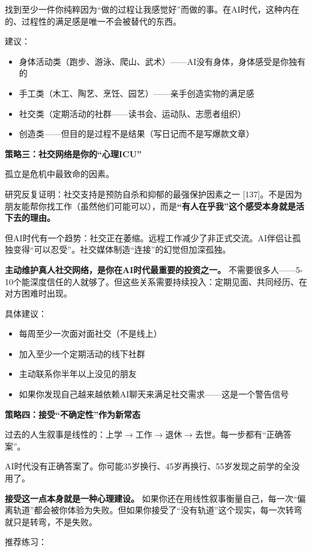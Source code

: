\documentclass[11pt,a4paper]{ctexart}
\begin{document}
找到至少一件你纯粹因为“做的过程让我感觉好”而做的事。在AI时代，这种内在的、过程性的满足感是唯一不会被替代的东西。

建议：

\begin{itemize}
  \item 身体活动类（跑步、游泳、爬山、武术）——AI没有身体，身体感受是你独有的
  \item 手工类（木工、陶艺、烹饪、园艺）——亲手创造实物的满足感
  \item 社交类（定期活动的社群——读书会、运动队、志愿者组织）
  \item 创造类——但目的是过程不是结果（写日记而不是写爆款文章）
\end{itemize}

\textbf{策略三：社交网络是你的“心理ICU”}

孤立是危机中最致命的因素。

研究反复证明：社交支持是预防自杀和抑郁的最强保护因素之一 [137]。不是因为朋友能帮你找工作（虽然他们可能可以），而是\textbf{“有人在乎我”这个感受本身就是活下去的理由。}

但AI时代有一个趋势：社交正在萎缩。远程工作减少了非正式交流。AI伴侣让孤独变得“可以忍受”。社交媒体制造“连接”的幻觉但加深孤独。

\textbf{主动维护真人社交网络，是你在AI时代最重要的投资之一。} 不需要很多人——5-10个能深度信任的人就够了。但这些关系需要持续投入：定期见面、共同经历、在对方困难时出现。

具体建议：

\begin{itemize}
  \item 每周至少一次面对面社交（不是线上）
  \item 加入至少一个定期活动的线下社群
  \item 主动联系你半年以上没见的朋友
  \item 如果你发现自己越来越依赖AI聊天来满足社交需求——这是一个警告信号
\end{itemize}

\textbf{策略四：接受“不确定性”作为新常态}

过去的人生叙事是线性的：上学$\to$工作$\to$退休$\to$去世。每一步都有“正确答案”。

AI时代没有正确答案了。你可能35岁换行、45岁再换行、55岁发现之前学的全没用了。

\textbf{接受这一点本身就是一种心理建设。} 如果你还在用线性叙事衡量自己，每一次“偏离轨道”都会被你体验为失败。但如果你接受了“没有轨道”这个现实，每一次转弯就只是转弯，不是失败。

推荐练习：
\end{document}
